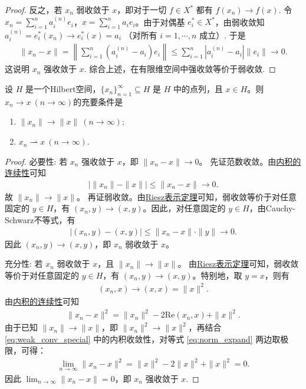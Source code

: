 \documentclass[../../main.tex]{subfiles}%
\begin{document}
\begin{proof}
反之，若 \(x_n\) 弱收敛于 \(x\)，即对于一切 \(f\in X^*\) 都有 \(f(x_n)\to f(x)\).
令 \(x_n = \sum\limits_{i=1}^n a_i^{(n)} e_i\)，\(x = \sum\limits_{i=1}^n a_i e_i\)。由于对偶基 \(e_i^*\in X^*\)，由弱收敛知 \(a_i^{(n)} = e_i^*(x_n) \to e_i^*(x) = a_i\) （对所有 \(i=1,\cdots,n\) 成立）.
于是
\begin{align*}
\|x_n-x\| = \left\|\sum\limits_{i=1}^n (a_i^{(n)} - a_i) e_i\right\| \leqslant \sum\limits_{i=1}^n |a_i^{(n)} - a_i| \|e_i\| \to 0.
\end{align*}
这说明 \(x_n\) 强收敛于 \(x\). 综合上述，在有限维空间中强收敛等价于弱收敛.
\end{proof}

\begin{proposition}
设 \(H\) 是一个Hilbert空间，\(\{x_n\}_{n=1}^{\infty} \subseteq H\) 是 \(H\) 中的点列，且 \(x \in H\)。则 $x_n\to x\ (n\to\infty)$的充要条件是
\begin{enumerate}[(1)]
\item $\|x_n\|\to\|x\|\ (n\to\infty)$;
\item $x_n\rightharpoonup x\ (n\to\infty)$.
\end{enumerate}
\end{proposition}
\begin{proof}

{\heiti 必要性:} 若 \(x_n\) 强收敛于 \(x\)，即 \(\|x_n - x\| \to 0\)。
先证范数收敛。由\hyperref[proposition:内积的连续性]{内积的连续性}可知
\begin{align*}
|\|x_n\| - \|x\|| \leqslant \|x_n - x\| \to 0.
\end{align*}
故 \(\|x_n\| \to \|x\|\)。
再证弱收敛。由\hyperref[theorem:Riesz表示定理-泛函]{Riesz表示定理}可知，弱收敛等价于对任意固定的 \(y \in H\)，有 \((x_n, y) \to (x, y)\)。因此，对任意固定的 \(y \in H\)，由Cauchy-Schwarz不等式，有
\begin{align}
|(x_n, y) - (x, y)| \leqslant \|x_n - x\| \cdot \|y\| \to 0.
\end{align}
因此 \((x_n, y) \to (x, y)\)，即 \(x_n\) 弱收敛于 \(x\)。

{\heiti 充分性:} 若 \(x_n\) 弱收敛于 \(x\)，且 \(\|x_n\| \to \|x\|\)。
由\hyperref[theorem:Riesz表示定理-泛函]{Riesz表示定理}可知，弱收敛等价于对任意固定的 \(y \in H\)，有 \((x_n, y) \to (x, y)\)。特别地，取 \(y = x\)，则有
\begin{align}
\label{eq:weak_conv_special}
(x_n, x) \to (x, x) = \|x\|^{2}.
\end{align}
由\hyperref[proposition:内积的连续性]{内积的连续性}可知
\begin{align}
\label{eq:norm_expand}
\|x_n - x\|^2 = \|x_n\|^2 - 2\text{Re}(x_n, x) + \|x\|^{2}.
\end{align}
由于已知 \(\|x_n\| \to \|x\|\)，即 \(\|x_n\|^2 \to \|x\|^2\)，再结合 \eqref{eq:weak_conv_special} 中的内积收敛性，对等式 \eqref{eq:norm_expand} 两边取极限，可得：
\begin{align*}
\lim_{n\to\infty} \|x_n - x\|^2 = \|x\|^2 - 2\|x\|^2 + \|x\|^2 = 0.
\end{align*}
因此 \(\lim_{n\to\infty} \|x_n - x\| = 0\)，即 \(x_n\) 强收敛于 \(x\).
\end{proof}
\end{document}
